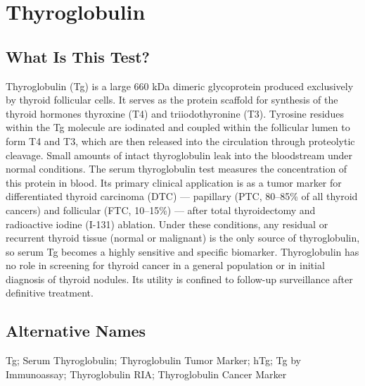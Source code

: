 \chapter{Thyroglobulin}

\section*{What Is This Test?}
Thyroglobulin (Tg) is a large 660 kDa dimeric glycoprotein produced exclusively by thyroid follicular cells. It serves as the protein scaffold for synthesis of the thyroid hormones thyroxine (T4) and triiodothyronine (T3). Tyrosine residues within the Tg molecule are iodinated and coupled within the follicular lumen to form T4 and T3, which are then released into the circulation through proteolytic cleavage. Small amounts of intact thyroglobulin leak into the bloodstream under normal conditions. The serum thyroglobulin test measures the concentration of this protein in blood. Its primary clinical application is as a tumor marker for differentiated thyroid carcinoma (DTC) --- papillary (PTC, 80--85\% of all thyroid cancers) and follicular (FTC, 10--15\%) --- after total thyroidectomy and radioactive iodine (I-131) ablation. Under these conditions, any residual or recurrent thyroid tissue (normal or malignant) is the only source of thyroglobulin, so serum Tg becomes a highly sensitive and specific biomarker. Thyroglobulin has no role in screening for thyroid cancer in a general population or in initial diagnosis of thyroid nodules. Its utility is confined to follow-up surveillance after definitive treatment.

\section*{Alternative Names}
Tg; Serum Thyroglobulin; Thyroglobulin Tumor Marker; hTg; Tg by Immunoassay; Thyroglobulin RIA; Thyroglobulin Cancer Marker

